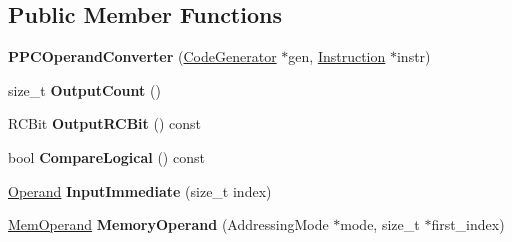 \subsection*{Public Member Functions}
\begin{DoxyCompactItemize}
\item 
{\bfseries P\+P\+C\+Operand\+Converter} (\hyperlink{classv8_1_1internal_1_1compiler_1_1_code_generator}{Code\+Generator} $\ast$gen, \hyperlink{classv8_1_1internal_1_1compiler_1_1_instruction}{Instruction} $\ast$instr)\hypertarget{classv8_1_1internal_1_1compiler_1_1_p_p_c_operand_converter_a32c83d979a4b7e506eed5266c3ad2dff}{}\label{classv8_1_1internal_1_1compiler_1_1_p_p_c_operand_converter_a32c83d979a4b7e506eed5266c3ad2dff}

\item 
size\+\_\+t {\bfseries Output\+Count} ()\hypertarget{classv8_1_1internal_1_1compiler_1_1_p_p_c_operand_converter_a284abaebfcdb13723f8bc929113a36fc}{}\label{classv8_1_1internal_1_1compiler_1_1_p_p_c_operand_converter_a284abaebfcdb13723f8bc929113a36fc}

\item 
R\+C\+Bit {\bfseries Output\+R\+C\+Bit} () const \hypertarget{classv8_1_1internal_1_1compiler_1_1_p_p_c_operand_converter_a9801d0b2c0eff5159f227a450bf3f1ef}{}\label{classv8_1_1internal_1_1compiler_1_1_p_p_c_operand_converter_a9801d0b2c0eff5159f227a450bf3f1ef}

\item 
bool {\bfseries Compare\+Logical} () const \hypertarget{classv8_1_1internal_1_1compiler_1_1_p_p_c_operand_converter_a7a4ee062ca72a4e37154547a044aab09}{}\label{classv8_1_1internal_1_1compiler_1_1_p_p_c_operand_converter_a7a4ee062ca72a4e37154547a044aab09}

\item 
\hyperlink{classv8_1_1internal_1_1_operand}{Operand} {\bfseries Input\+Immediate} (size\+\_\+t index)\hypertarget{classv8_1_1internal_1_1compiler_1_1_p_p_c_operand_converter_a2a90d4958928ace5f32676e85c1c8458}{}\label{classv8_1_1internal_1_1compiler_1_1_p_p_c_operand_converter_a2a90d4958928ace5f32676e85c1c8458}

\item 
\hyperlink{classv8_1_1internal_1_1_mem_operand}{Mem\+Operand} {\bfseries Memory\+Operand} (Addressing\+Mode $\ast$mode, size\+\_\+t $\ast$first\+\_\+index)\hypertarget{classv8_1_1internal_1_1compiler_1_1_p_p_c_operand_converter_afd98962641aca707a642af4fe0cd1daf}{}\label{classv8_1_1internal_1_1compiler_1_1_p_p_c_operand_converter_afd98962641aca707a642af4fe0cd1daf}


\end{DoxyCompactItemize}
